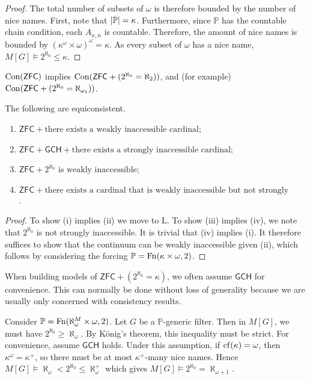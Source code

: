 \begin{proof}
    The total number of subsets of \( \omega \) is therefore bounded by the number of nice names.
    First, note that \( \abs{\mathbb P} = \kappa \).
    Furthermore, since \( \mathbb P \) has the countable chain condition, each \( A_{\dot x, n} \) is countable.
    Therefore, the amount of nice names is bounded by \( (\kappa^\omega \times \omega)^\omega = \kappa \).
    As every subset of \( \omega \) has a nice name, \( M[G] \vDash 2^{\aleph_0} \leq \kappa \).
\end{proof}
\begin{corollary}
    \( \operatorname{Con}(\mathsf{ZFC}) \) implies \( \operatorname{Con}(\mathsf{ZFC} + (2^{\aleph_0} = \aleph_2)) \), and (for example) \( \operatorname{Con}(\mathsf{ZFC} + (2^{\aleph_0} = \aleph_{\omega_1})) \).
\end{corollary}
\begin{corollary}
    The following are equiconsistent.
    \begin{enumerate}
        \item \( \mathsf{ZFC} + \text{there exists a weakly inaccessible cardinal} \);
        \item \( \mathsf{ZFC} + \mathsf{GCH} + \text{there exists a strongly inaccessible cardinal} \);
        \item \( \mathsf{ZFC} + 2^{\aleph_0} \text{ is weakly inaccessible} \);
        \item \( \mathsf{ZFC} + \text{there exists a cardinal that is weakly inaccessible but not strongly inaccessible} \).
    \end{enumerate}
\end{corollary}
\begin{proof}
    To show (i) implies (ii) we move to \( \mathrm{L} \).
    To show (iii) implies (iv), we note that \( 2^{\aleph_0} \) is not strongly inaccessible.
    It is trivial that (iv) implies (i).
    It therefore suffices to show that the continuum can be weakly inaccessible given (ii), which follows by considering the forcing \( \mathbb P = \operatorname{Fn}(\kappa \times \omega, 2) \).
\end{proof}
\begin{remark}
    When building models of \( \mathsf{ZFC} + (2^{\aleph_0} = \kappa) \), we often assume \( \mathsf{GCH} \) for convenience.
    This can normally be done without loss of generality because we are usually only concerned with consistency results.
\end{remark}
\begin{example}
    Consider \( \mathbb P = \operatorname{Fn}(\aleph_\omega^M \times \omega, 2) \).
    Let \( G \) be a \( \mathbb P \)-generic filter.
    Then in \( M[G] \), we must have \( 2^{\aleph_0} \geq \aleph_\omega \).
    By K\"onig's theorem, this inequality must be strict.
    For convenience, assume \( \mathsf{GCH} \) holds.
    Under this assumption, if \( \operatorname{cf}(\kappa) = \omega \), then \( \kappa^\omega = \kappa^+ \), so there must be at most \( \kappa^+ \)-many nice names.
    Hence \( M[G] \vDash \aleph_\omega < 2^{\aleph_0} \leq \aleph_\omega^+ \) which gives \( M[G] \vDash 2^{\aleph_0} = \aleph_{\omega + 1} \).
\end{example}
